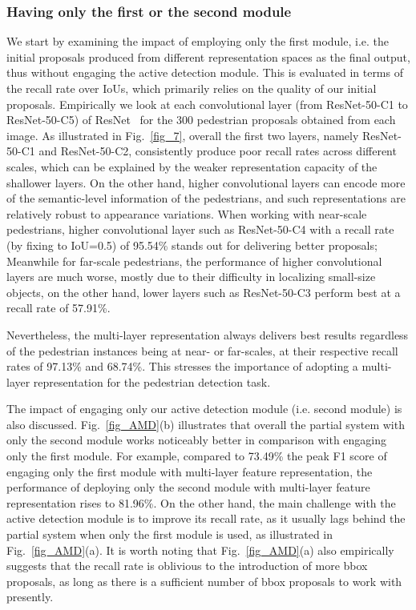\documentclass[10pt,journal,compsoc,twoside]{IEEEtran}
\begin{document}
\subsubsection{Having only the first or the second module}
We start by examining the impact of employing only the first module, i.e. the initial proposals produced from different representation spaces as the final output,
thus without engaging the active detection module.
%
This is evaluated in terms of the recall rate over IoUs, which primarily relies on the quality of our initial proposals.
Empirically we look at each convolutional layer (from ResNet-50-C1 to ResNet-50-C5) of ResNet~\cite{HeEtAl:cvpr16} for the 300 pedestrian proposals obtained from each image.
As illustrated in Fig.~\ref{fig_7}, overall the first two layers, namely ResNet-50-C1 and ResNet-50-C2, consistently produce poor recall rates across different scales,
which can be explained by the weaker representation capacity of the shallower layers.
On the other hand, higher convolutional layers can encode more of the semantic-level information of the pedestrians,
and such representations are relatively robust to appearance variations.
%
When working with near-scale pedestrians, higher convolutional layer such as ResNet-50-C4 with a recall rate (by fixing to IoU=0.5) of 95.54\% stands out for delivering better proposals;
Meanwhile for far-scale pedestrians, the performance of higher convolutional layers are much worse, mostly due to their difficulty in localizing small-size objects,
on the other hand, lower layers such as ResNet-50-C3 perform best at a recall rate of 57.91\%.

Nevertheless, the multi-layer representation always delivers best results regardless of the pedestrian instances being at near- or far-scales,
at their respective recall rates of 97.13\% and 68.74\%.
This stresses the importance of adopting a multi-layer representation for the pedestrian detection task.



The impact of engaging only our active detection module (i.e. second module) is also discussed.
Fig.~\ref{fig_AMD}(b) illustrates that overall the partial system with only the second module works noticeably better in comparison with engaging only the first module.
For example, compared to 73.49\% the peak F1 score of engaging only the first module with multi-layer feature representation,
the performance of deploying only the second module with multi-layer feature representation rises to 81.96\%.
On the other hand, the main challenge with the active detection module is to improve its recall rate,
as it usually lags behind the partial system when only the first module is used, as illustrated in Fig.~\ref{fig_AMD}(a).
It is worth noting that Fig.~\ref{fig_AMD}(a) also empirically suggests that the recall rate is oblivious to the introduction of more bbox proposals,
as long as there is a sufficient number of bbox proposals to work with presently.
\end{document}
